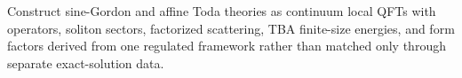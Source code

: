 \begin{openproblem}
\label{op:constructive-integrable-model-comparison}
Construct sine-Gordon and affine Toda theories as continuum local QFTs with
operators, soliton sectors, factorized scattering, TBA finite-size energies,
and form factors derived from one regulated framework rather than matched
only through separate exact-solution data.
\end{openproblem}
